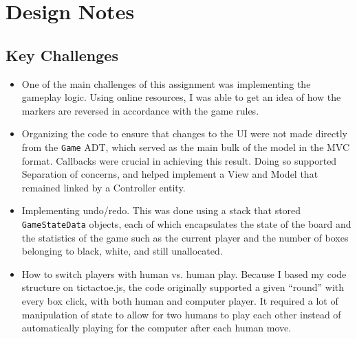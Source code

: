 \documentclass[11pt,letterpaper]{article}
\begin{document}
\section{Design Notes}
\subsection{Key Challenges}
\begin{itemize}
\item One of the main challenges of this assignment was implementing the gameplay logic. Using online resources, I was able to get an idea of how the markers are reversed in accordance with the game rules.
\item Organizing the code to ensure that changes to the UI were not made directly from the \texttt{Game} ADT, which served as the main bulk of the model in the MVC format. Callbacks were crucial in achieving this result. Doing so supported Separation of concerns, and helped implement a View and Model that remained linked by a Controller entity.
\item Implementing undo/redo. This was done using a stack that stored \texttt{GameStateData} objects, each of which encapsulates the state of the board and the statistics of the game such as the current player and the number of boxes belonging to black, white, and still unallocated. 
\item How to switch players with human vs. human play. Because I based my code structure on tictactoe.js, the code originally supported a given ``round'' with every box click, with both human and computer player. It required a lot of manipulation of state to allow for two humans to play each other instead of automatically playing for the computer after each human move.
\end{itemize}
\end{document}
